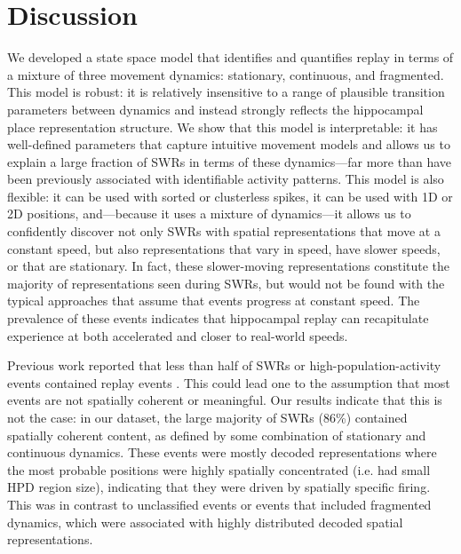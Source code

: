 \documentclass[9pt,lineno]{elife}
\begin{document}
\section*{Discussion}
We developed a state space model that identifies and quantifies replay in terms of a mixture of three movement dynamics: stationary, continuous, and fragmented. This model is robust: it is relatively insensitive to a range of plausible transition parameters between dynamics and instead strongly reflects the hippocampal place representation structure. We show that this model is interpretable: it has well-defined parameters that capture intuitive movement models and allows us to explain a large fraction of SWRs in terms of these dynamics---far more than have been previously associated with identifiable activity patterns. This model is also flexible: it can be used with sorted or clusterless spikes, it can be used with 1D or 2D positions, and---because it uses a mixture of dynamics---it allows us to confidently discover not only SWRs with spatial representations that move at a constant speed, but also representations that vary in speed, have slower speeds, or that are stationary. In fact, these slower-moving representations constitute the majority of representations seen during SWRs, but would not be found with the typical approaches that assume that events progress at constant speed. The prevalence of these events indicates that hippocampal replay can recapitulate experience at both accelerated and closer to real-world speeds.

Previous work reported that less than half of SWRs or high-population-activity events contained replay events \citep{KarlssonAwakereplayremote2009, FosterReversereplaybehavioural2006, DavidsonHippocampalReplayExtended2009}. This could lead one to the assumption that most events are not spatially coherent or meaningful. Our results indicate that this is not the case: in our dataset, the large majority of SWRs (86\%) contained spatially coherent content, as defined by some combination of stationary and continuous dynamics. These events were mostly decoded representations where the most probable positions were highly spatially concentrated (i.e. had small HPD region size), indicating that they were driven by spatially specific firing. This was in contrast to unclassified events or events that included fragmented dynamics, which were associated with highly distributed decoded spatial representations. 
\end{document}
